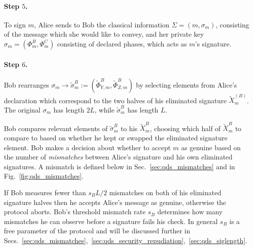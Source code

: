 \paragraph{Step $5$.}
To sign $m$, Alice sends to Bob the classical information $\Sigma = \left(m, \sigma_m\right)$, consisting of the message which she would like to convey, and her private key $\sigma_m = \left(\Phi_m^B, \Phi_m^C\right)$ consisting of declared phases, which acts as $m$'s signature. 


\paragraph{Step $6$.} Bob rearranges $\sigma_m \rightarrow \tilde{\sigma}_m^B := \left(\tilde{\Phi}_{Y, m}^B, \tilde{\Phi}_{Z, m}^B\right)$ by selecting elements from Alice's declaration which correspond to the two halves of his eliminated signature $\tilde{X}_m^{\left(B\right)}$. The original $\sigma_m$ has length $2 L$, while $\tilde{\sigma}_m^B$ has length $L$.

Bob compares relevant elements of $\tilde{\sigma}_m^B$ to his $\tilde{X}_m^{B}$, choosing which half of $\tilde{X}_m^B$ to compare to based on whether he kept or swapped the eliminated signature element. Bob makes a decision about whether to accept $m$ as genuine based on the number of \emph{mismatches} between Alice's signature and his own eliminated signatures. A mismatch is defined below in Sec.~\ref{sec:qds_mismatches} and in Fig.~\ref{fig:qds_mismatches}.


If Bob measures fewer than $s_B L/2$ mismatches on both of his eliminated signature halves then he accepts Alice's message as genuine, otherwise the protocol aborts. Bob's threshold mismatch rate $s_B$ determines how many mismatches he can observe before a signature fails his check. In general $s_B$ is a free parameter of the protocol and will be discussed further in Secs.~\ref{sec:qds_mismatches},~\ref{sec:qds_security_repudiation},~\ref{sec:qds_siglength}.


